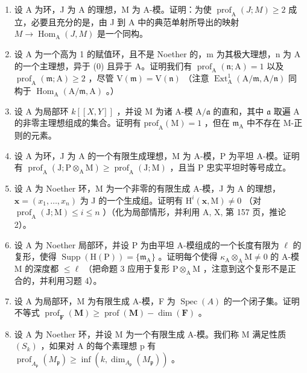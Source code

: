
\begin{enumerate}
\def\labelenumi{\arabic{enumi})}
\item
  设 A 为环，J 为 A 的理想，M 为 A-模。证明：为使 \(\operatorname{prof}_{\mathrm{A}}(J;M)\geqslant2\) 成立，必要且充分的是，由 J 到 A 中的典范单射所导出的映射 \(M\to\operatorname{Hom}_{\mathrm{A}}(J,M)\) 是一个同构。
\item
  设 A 为一个高为 1 的赋值环，且不是 Noether 的，m 为其极大理想，n 为 A 的一个主理想，异于 (0) 且异于 A。证明我们有 \(\operatorname{prof}_{\mathrm{A}}(\mathfrak{n};\mathrm{A})=1\) 以及 \(\operatorname{prof}_{\mathrm{A}}(\mathfrak{m};\mathrm{A})\geqslant2\) ，尽管 \(\mathrm{V}(\mathfrak{m})=\mathrm{V}(\mathfrak{n})\) （注意 \(\operatorname{Ext}_{\mathrm{A}}^{1}(\mathrm{A}/\mathfrak{m},\mathrm{A}/\mathfrak{n})\) 同构于 \(\operatorname{Hom}_{\mathrm{A}}(\mathrm{A}/\mathfrak{m},\mathrm{A})\) 。）
\item
  设 A 为局部环 \(k[[X,Y]]\) ，并设 M 为诸 A-模 \(\mathrm{A}/\mathfrak{a}\) 的直和，其中 \(\mathfrak{a}\) 取遍 A 的非零主理想组成的集合。证明有 \(\mathrm{prof}_{\mathrm{A}}(\mathrm{M}) = 1\) ，但在 \(\mathfrak{m}_{\mathrm{A}}\) 中不存在 M-正则的元素。
\item
  设 A 为环，J 为 A 的一个有限生成理想，M 为 A-模，P 为平坦 A-模。证明有 \(\operatorname{prof}_{\mathrm{A}}(\mathrm{J};\mathrm{P}\otimes_{\mathrm{A}}\mathrm{M})\geqslant\operatorname{prof}_{\mathrm{A}}(\mathrm{J};\mathrm{M})\) ，且当 P 忠实平坦时等号成立。
\item
  设 \(\mathrm{A}\) 为 Noether 环，M 为一个非零的有限生成 A-模，J 为 \(\mathrm{A}\) 的理想，\(\mathbf{x} = (x_1, \ldots, x_n)\) 为 J 的一个生成组。证明有 \(\mathrm{H}^i(\mathbf{x}, \mathrm{M}) \neq 0\) （对 \(\operatorname{prof}_{\mathrm{A}}(\mathrm{J}; \mathrm{M}) \leqslant i \leqslant n\) ）（化为局部情形，并利用 A, X, 第 157 页，推论 2）。
\item
  设 A 为 Noether 局部环，并设 P 为由平坦 A-模组成的一个长度有限为 \(\ell\) 的复形，使得 \(\operatorname{Supp}(\mathrm{H}(\mathrm{P})) = \{\mathfrak{m}_{\mathrm{A}}\}\) 。证明每个使得 \(\kappa_{\mathrm{A}} \otimes_{\mathrm{A}} \mathrm{M} \neq 0\) 的 A-模 M 的深度都 \(\leqslant \ell\) （把命题 3 应用于复形 \(\mathrm{P} \otimes_{\mathrm{A}} \mathrm{M}\) ，注意到这个复形不是正合的，并利用习题 4）。
\item
  设 A 为局部环，M 为有限生成 A-模，F 为 \(\operatorname{Spec}(A)\) 的一个闭子集。证明不等式 \(\operatorname{prof}_{\mathbf{F}}(\mathbf{M}) \geqslant \operatorname{prof}(\mathbf{M}) - \dim(\mathbf{F})\) 。
\item
  设 A 为 Noether 环，并设 M 为一个有限生成 A-模。我们称 M 满足性质 \((S_{k})\) ，如果对 A 的每个素理想 p 有 \(\operatorname{prof}_{A_{\mathfrak{p}}}(M_{\mathfrak{p}}) \geqslant \inf(k, \dim_{A_{\mathfrak{p}}}(M_{\mathfrak{p}}))\) 。
\end{enumerate}


